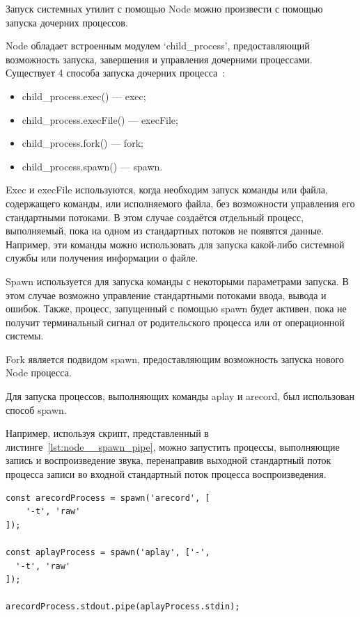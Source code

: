 Запуск системных утилит с помощью Node можно произвести с помощью запуска дочерних процессов.

Node обладает встроенным модулем `child\_process', предоставляющий возможность запуска, завершения и управления дочерними процессами. Существует 4 способа запуска дочерних процесса~\cite{node}:

\begin{itemize}
  \item child\_process.exec() --- exec;
  \item child\_process.execFile() --- execFile;
  \item child\_process.fork() --- fork;
  \item child\_process.spawn() --- spawn.
\end{itemize}

Exec и execFile используются, когда необходим запуск команды или файла, содержащего команды, или исполняемого файла, без возможности управления его стандартными потоками. В этом случае создаётся отдельный процесс, выполняемый, пока на одном из стандартных потоков не появятся данные. Например, эти команды можно использовать для запуска какой-либо системной службы или получения информации о файле.

Spawn используется для запуска команды с некоторыми параметрами запуска. В этом случае возможно управление стандартными потоками ввода, вывода и ошибок. Также, процесс, запущенный с помощью spawn будет активен, пока не получит терминальный сигнал от родительского процесса или от операционной системы.

Fork является подвидом spawn, предоставляющим возможность запуска нового Node процесса.

Для запуска процессов, выполняющих команды aplay и arecord, был использован способ spawn.

Например, используя скрипт, представленный в листинге~\ref{lst:node__spawn_pipe}, можно запустить процессы, выполняющие запись и воспроизведение звука, перенаправив выходной стандартный поток процесса записи во входной стандартный поток процесса воспроизведения.

\begin{lstlisting}[style=ES6, caption={Пример запуска процессов и перенаправления потоков процессов}, label={lst:node__spawn_pipe}]
const arecordProcess = spawn('arecord', [
    '-t', 'raw'
]);

const aplayProcess = spawn('aplay', ['-',
  '-t', 'raw'
]);

arecordProcess.stdout.pipe(aplayProcess.stdin);
\end{lstlisting}

